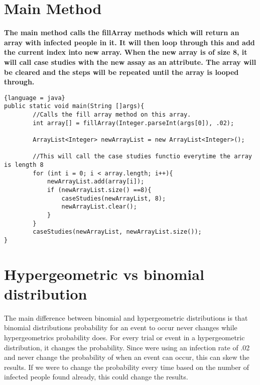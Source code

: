 \documentclass{article}
\begin{document}
\section{Main Method}
\textbf{ The main method calls the fillArray methods which will return an array with infected people in it. It will then loop through this and add the current index into new array. When the new array is of size 8, it will call case studies with the new assay as an attribute. The array will be cleared and the steps will be repeated until the array is looped through. }
\begin{lstlisting}{language = java}
public static void main(String []args){
        //Calls the fill array method on this array.
        int array[] = fillArray(Integer.parseInt(args[0]), .02);
        
        ArrayList<Integer> newArrayList = new ArrayList<Integer>();

        //This will call the case studies functio everytime the array is length 8
        for (int i = 0; i < array.length; i++){
            newArrayList.add(array[i]);
            if (newArrayList.size() ==8){
                caseStudies(newArrayList, 8);
                newArrayList.clear();
            }
        }
        caseStudies(newArrayList, newArrayList.size());
}
\end{lstlisting}
\section{Hypergeometric vs binomial distribution}
\begin{center}

The main difference between binomial and hypergeometric distributions is that binomial distributions probability for an event to occur never changes while hypergeometrics probability does. For every trial or event in a hypergeometric distribution, it changes the probability. Since were using an infection rate of .02 and never change the probability of when an event can occur, this can skew the results. If we were to change the probability every time based on the number of infected people found already, this could change the results.
\end{center}
\end{document}

